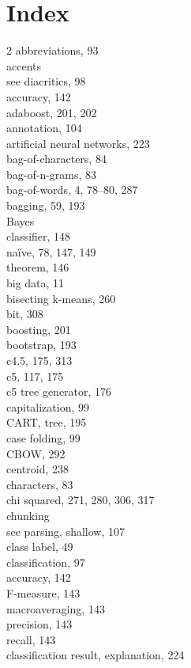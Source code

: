 \documentclass[twoside,11pt]{book}
\begin{document}
\chapter*{Index}
\begin{multicols}{2}
\hspace{-1.5em}abbreviations, 93\\
accents\\
see diacritics, 98\\
accuracy, 142\\
adaboost, 201, 202\\
annotation, 104\\
artificial neural networks, 223\\
bag-of-characters, 84\\
bag-of-n-grams, 83\\
bag-of-words, 4, 78--80, 287\\
bagging, 59, 193\\
Bayes\\
classifier, 148\\
naïve, 78, 147, 149\\
theorem, 146\\
big data, 11\\
bisecting k-means, 260\\
bit, 308\\
boosting, 201\\
bootstrap, 193\\
c4.5, 175, 313\\
c5, 117, 175\\
c5 tree generator, 176\\
capitalization, 99\\
CART, tree, 195\\
case folding, 99\\
CBOW, 292\\
centroid, 238\\
characters, 83\\
chi squared, 271, 280, 306, 317\\
chunking\\
see parsing, shallow, 107\\
class label, 49\\
classification, 97\\
accuracy, 142\\
F-measure, 143\\
macroaveraging, 143\\
precision, 143\\
recall, 143\\
classification result, explanation, 224\\

\end{multicols}
\end{document}
